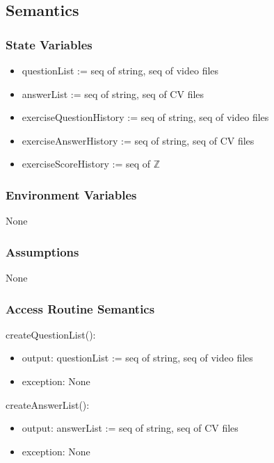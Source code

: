 \documentclass[12pt, titlepage]{article}
\begin{document}
\subsection{Semantics}

\subsubsection{State Variables}

\begin{itemize}
    \item questionList := seq of string, seq of video files
    \item answerList := seq of string, seq of CV files
    \item exerciseQuestionHistory := seq of string, seq of video files
    \item exerciseAnswerHistory := seq of string, seq of CV files 
    \item exerciseScoreHistory := seq of $\mathbb{Z}$ 
\end{itemize}

\subsubsection{Environment Variables}
 
None 

\subsubsection{Assumptions}

None 

\subsubsection{Access Routine Semantics}

\noindent createQuestionList(): 
\begin{itemize}
\item output: questionList := seq of string, seq of video files
\item exception: None
\end{itemize}

\noindent createAnswerList(): 
\begin{itemize}
\item output: answerList := seq of string, seq of CV files
\item exception: None
\end{itemize}
\end{document}

